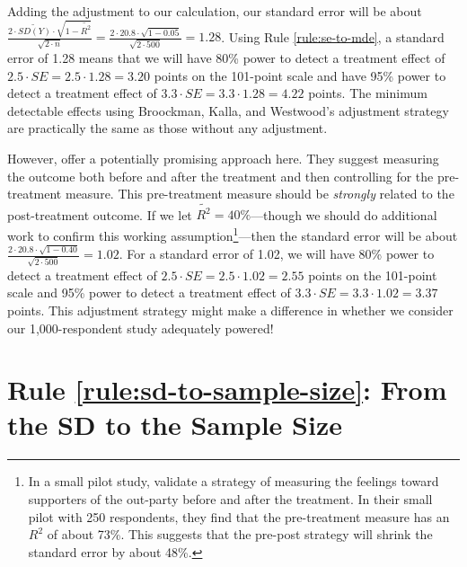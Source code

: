 \documentclass[12pt]{article}
\begin{document}
Adding the adjustment to our calculation, our standard error will be about $\frac{2 \cdot \widetilde{SD(Y)}\cdot \sqrt{1 - \widetilde{R^{2}}}}{\sqrt{2 \cdot n}} = \frac{2 \cdot 20.8 \cdot \sqrt{1 - 0.05}}{\sqrt{2 \cdot 500}} = 1.28$.
Using Rule \ref{rule:se-to-mde}, a standard error of 1.28 means that we will have 80\% power to detect a treatment effect of $2.5 \cdot SE = 2.5 \cdot 1.28 = 3.20$ points on the 101-point scale and have 95\% power to detect a treatment effect of $3.3 \cdot SE = 3.3 \cdot 1.28 = 4.22$ points. 
The minimum detectable effects using Broockman, Kalla, and Westwood's adjustment strategy are practically the same as those without any adjustment.

However, \cite{Clifford2021} offer a potentially promising approach here. 
They suggest measuring the outcome both before and after the treatment and then controlling for the pre-treatment measure. 
This pre-treatment measure should be \emph{strongly} related to the post-treatment outcome. 
If we let $\widetilde{R^{2}} = 40\%$---though we should do additional work to confirm this working assumption\footnote{
  In a small pilot study, \cite{Culter2024} validate a strategy of measuring the feelings toward supporters of the out-party before and after the treatment. 
  In their small pilot with 250 respondents, they find that the pre-treatment measure has an $R^{2}$ of about 73\%. 
  This suggests that the pre-post strategy will shrink the standard error by about 48\%.}---then the standard error will be about $\frac{2 \cdot 20.8 \cdot \sqrt{1 - 0.40}}{\sqrt{2 \cdot 500}} = 1.02$. 
For a standard error of 1.02, we will have 80\% power to detect a treatment effect of $2.5 \cdot SE = 2.5 \cdot 1.02 = 2.55$ points on the 101-point scale and 95\% power to detect a treatment effect of $3.3 \cdot SE = 3.3 \cdot 1.02 = 3.37$ points. 
This adjustment strategy might make a difference in whether we consider our 1,000-respondent study adequately powered!

\section*{Rule \ref{rule:sd-to-sample-size}: From the SD to the Sample Size}
\end{document}
